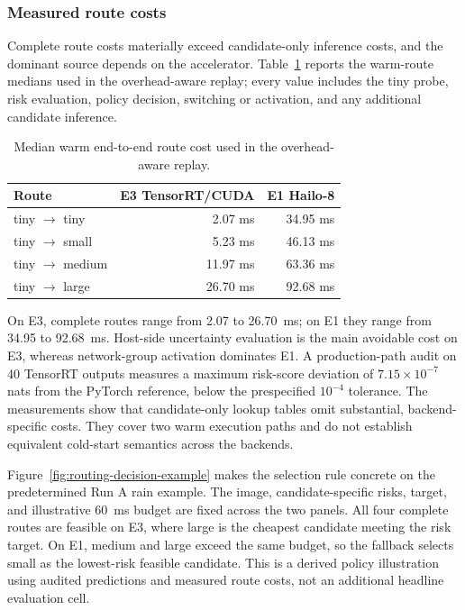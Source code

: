 \documentclass[a4paper,review,12pt]{elsarticle}
\begin{document}
\subsubsection{Measured route costs}

Complete route costs materially exceed candidate-only inference costs, and the dominant source depends on the accelerator. Table~\ref{tab:routes} reports the warm-route medians used in the overhead-aware replay; every value includes the tiny probe, risk evaluation, policy decision, switching or activation, and any additional candidate inference.

\begin{table}[H]
\centering
\caption{Median warm end-to-end route cost used in the overhead-aware replay.}
\label{tab:routes}
\begin{tabular}{@{}lrr@{}}
\toprule
Route & E3 TensorRT/CUDA & E1 Hailo-8 \\
\midrule
tiny $\rightarrow$ tiny & 2.07 ms & 34.95 ms \\
tiny $\rightarrow$ small & 5.23 ms & 46.13 ms \\
tiny $\rightarrow$ medium & 11.97 ms & 63.36 ms \\
tiny $\rightarrow$ large & 26.70 ms & 92.68 ms \\
\bottomrule
\end{tabular}
\end{table}

On E3, complete routes range from 2.07 to 26.70~ms; on E1 they range from 34.95 to 92.68~ms. Host-side uncertainty evaluation is the main avoidable cost on E3, whereas network-group activation dominates E1. A production-path audit on 40 TensorRT outputs measures a maximum risk-score deviation of $7.15\times10^{-7}$ nats from the PyTorch reference, below the prespecified $10^{-4}$ tolerance. The measurements show that candidate-only lookup tables omit substantial, backend-specific costs. They cover two warm execution paths and do not establish equivalent cold-start semantics across the backends.

Figure~\ref{fig:routing-decision-example} makes the selection rule concrete on the predetermined Run A rain example. The image, candidate-specific risks, target, and illustrative 60~ms budget are fixed across the two panels. All four complete routes are feasible on E3, where large is the cheapest candidate meeting the risk target. On E1, medium and large exceed the same budget, so the fallback selects small as the lowest-risk feasible candidate. This is a derived policy illustration using audited predictions and measured route costs, not an additional headline evaluation cell.
\end{document}
